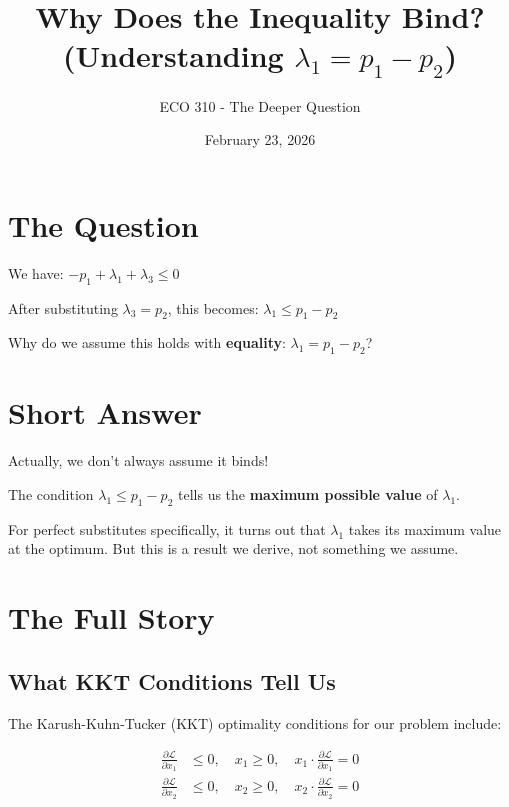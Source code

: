 \documentclass[11pt]{article}
\title{Why Does the Inequality Bind? \\ (Understanding $\lambda_1 = p_1 - p_2$)}
\author{ECO 310 - The Deeper Question}
\date{February 23, 2026}
\begin{document}
\maketitle

\section{The Question}

We have: $-p_1 + \lambda_1 + \lambda_3 \leq 0$

After substituting $\lambda_3 = p_2$, this becomes: $\lambda_1 \leq p_1 - p_2$

Why do we assume this holds with \textbf{equality}: $\lambda_1 = p_1 - p_2$?

\section{Short Answer}

\begin{tcolorbox}[colback=yellow!10!white,colframe=orange!75!black,title=Quick Answer]
Actually, we don't always assume it binds!

The condition $\lambda_1 \leq p_1 - p_2$ tells us the \textbf{maximum possible value} of $\lambda_1$.

For perfect substitutes specifically, it turns out that $\lambda_1$ takes its maximum value at the optimum. But this is a result we derive, not something we assume.
\end{tcolorbox}

\section{The Full Story}

\subsection{What KKT Conditions Tell Us}

The Karush-Kuhn-Tucker (KKT) optimality conditions for our problem include:

\begin{align}
\frac{\partial \mathcal{L}}{\partial x_1} &\leq 0, \quad x_1 \geq 0, \quad x_1 \cdot \frac{\partial \mathcal{L}}{\partial x_1} = 0 \\
\frac{\partial \mathcal{L}}{\partial x_2} &\leq 0, \quad x_2 \geq 0, \quad x_2 \cdot \frac{\partial \mathcal{L}}{\partial x_2} = 0
\end{align}
\end{document}
